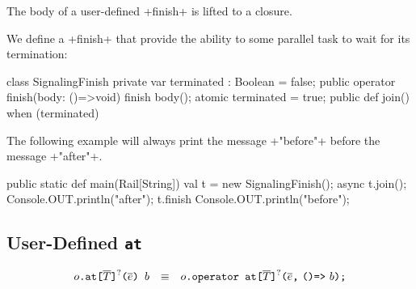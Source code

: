 The body of a user-defined \xcd+finish+ is lifted to a closure.

\begin{ex}
  We define a \xcd+finish+ that provide the ability to some parallel task to wait for its termination:
\begin{xten}
class SignalingFinish {
  private var terminated : Boolean = false;
  public operator finish(body: ()=>void) {
    finish {
      body();
    }
    atomic { terminated = true; }
  }
  public def join() {
    when (terminated) {}
  }
}
\end{xten}
%

  The following example will always print the message \xcd+"before"+
  before the message \xcd+"after"+.
\begin{xten}
public static def main(Rail[String]) {
  val t = new SignalingFinish();
  async {
    t.join();
    Console.OUT.println("after");
  }
  t.finish {
    Console.OUT.println("before");
  }
}
\end{xten}
\end{ex}

\subsection{User-Defined \texttt{at}}

$$
\begin{array}{rcl}
  {o}\texttt{.at}\texttt{[}{\overline{T}}\texttt{]}^?\texttt{(}{\overline{e}}\texttt{)~}{b}
  & \equiv &
  {o}\texttt{.operator~at}\texttt{[}{\overline{T}}\texttt{]}^?\texttt{(} {\overline{e}}\texttt{,}~ \texttt{()=>}~{b}\texttt{);}
\end{array}
$$

